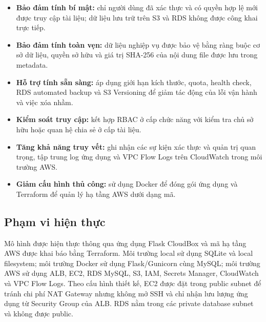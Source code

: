 \begin{itemize}
    \item \textbf{Bảo đảm tính bí mật:}
    chỉ người dùng đã xác thực và có quyền hợp lệ mới được
    truy cập tài liệu; dữ liệu lưu trữ trên S3 và RDS không
    được công khai trực tiếp.

    \item \textbf{Bảo đảm tính toàn vẹn:}
    dữ liệu nghiệp vụ được bảo vệ bằng ràng buộc cơ sở dữ liệu,
    quyền sở hữu và giá trị SHA-256 của nội dung file được
    lưu trong metadata.

    \item \textbf{Hỗ trợ tính sẵn sàng:}
    áp dụng giới hạn kích thước, quota, health check,
    RDS automated backup và S3 Versioning để giảm tác động
    của lỗi vận hành và việc xóa nhầm.

    \item \textbf{Kiểm soát truy cập:}
    kết hợp RBAC ở cấp chức năng với kiểm tra chủ sở hữu
    hoặc quan hệ chia sẻ ở cấp tài liệu.

    \item \textbf{Tăng khả năng truy vết:}
    ghi nhận các sự kiện xác thực và quản trị quan trọng,
    tập trung log ứng dụng và VPC Flow Logs trên CloudWatch
    trong môi trường AWS.

    \item \textbf{Giảm cấu hình thủ công:}
    sử dụng Docker để đóng gói ứng dụng và Terraform để
    quản lý hạ tầng AWS dưới dạng mã.
\end{itemize}

\subsection{Phạm vi hiện thực}

Mô hình được hiện thực thông qua ứng dụng Flask CloudBox
và mã hạ tầng AWS được khai báo bằng Terraform.
Môi trường local sử dụng SQLite và local filesystem;
môi trường Docker sử dụng Flask/Gunicorn cùng MySQL;
môi trường AWS sử dụng ALB, EC2, RDS MySQL, S3, IAM,
Secrets Manager, CloudWatch và VPC Flow Logs.
Theo cấu hình thiết kế, EC2 được đặt trong public subnet
để tránh chi phí NAT Gateway nhưng không mở SSH và chỉ
nhận lưu lượng ứng dụng từ Security Group của ALB.
RDS nằm trong các private database subnet và không
được public.

